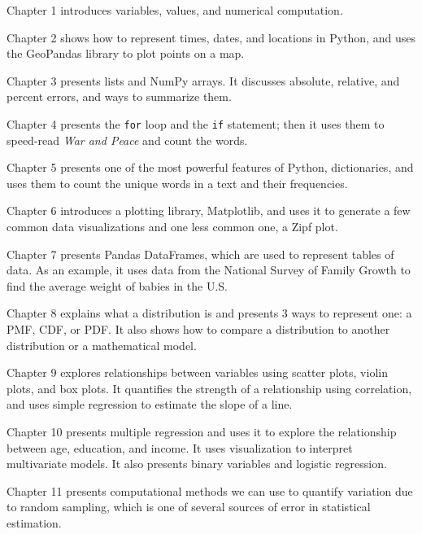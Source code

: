 \begin{description}

\item Chapter 1 introduces variables, values, and numerical computation.

\item Chapter 2 shows how to represent times, dates, and locations in Python, and uses the GeoPandas library to plot points on a map.

\item Chapter 3 presents lists and NumPy arrays. It discusses absolute, relative, and percent errors, and ways to summarize them.

\item Chapter 4 presents the \texttt{for} loop and the \texttt{if} statement; then it uses them to speed-read \emph{War and Peace} and count the words.

\item Chapter 5 presents one of the most powerful features of Python, dictionaries, and uses them to count the unique words in a text and their frequencies.

\item Chapter 6 introduces a plotting library, Matplotlib, and uses it to generate a few common data visualizations and one less common one, a Zipf plot.

\item Chapter 7 presents Pandas DataFrames, which are used to represent tables of data. As an example, it uses data from the National Survey of Family Growth to find the average weight of babies in the U.S.

\item Chapter 8 explains what a distribution is and presents 3 ways to represent one: a PMF, CDF, or PDF. It also shows how to compare a distribution to another distribution or a mathematical model.

\item Chapter 9 explores relationships between variables using scatter plots, violin plots, and box plots. It quantifies the strength of a relationship using correlation, and uses simple regression to estimate the slope of a line.

\item Chapter 10 presents multiple regression and uses it to explore the relationship between age, education, and income. It uses visualization to interpret multivariate models. It also presents binary variables and logistic regression.

\item Chapter 11 presents computational methods we can use to quantify variation due to random sampling, which is one of several sources of error in statistical estimation.


\end{description}

